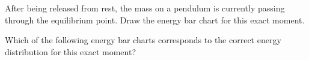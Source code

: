 \documentclass[]{exam}
\begin{document}
\begin{questions}
\question
After being released from rest, the mass on a pendulum is currently passing through the equilibrium point. Draw the energy bar chart for this exact moment.

\begin{center}
\end{center}

Which of the following energy bar charts corresponds to the correct energy distribution for this exact moment?


\end{questions}
\end{document}
